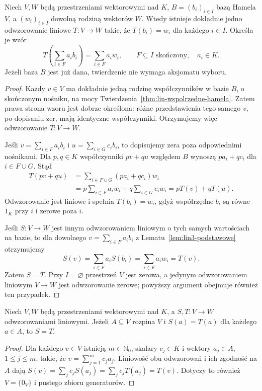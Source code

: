 \begin{twierdzenie}
\label{thm:lin3-przedluzenie-z-bazy}
Niech \(V,W\) będą przestrzeniami wektorowymi nad \(K\),
\(B=(b_i)_{i\in I}\) bazą Hamela \(V\), a
\((w_i)_{i\in I}\) dowolną rodziną wektorów \(W\).
Wtedy istnieje dokładnie jedno odwzorowanie liniowe
\(T\colon V\to W\) takie, że \(T(b_i)=w_i\)
dla każdego \(i\in I\). Określa je wzór
\[
 T\left(\sum_{i\in F}a_ib_i\right)
   =\sum_{i\in F}a_iw_i,
 \qquad F\subseteq I\text{ skończony},\quad a_i\in K.
\]
Jeżeli baza \(B\) jest już dana, twierdzenie
nie wymaga aksjomatu wyboru.
\end{twierdzenie}
\begin{proof}
Każdy \(v\in V\) ma dokładnie jedną rodzinę
współczynników w bazie \(B\), o skończonym nośniku,
na mocy Twierdzenia~\ref{thm:lin-wspolrzedne-hamela}.
Zatem prawa strona wzoru jest dobrze określona:
różne przedstawienia tego samego \(v\),
po dopisaniu zer, mają identyczne współczynniki.
Otrzymujemy więc odwzorowanie \(T\colon V\to W\).

Jeśli \(v=\sum_{i\in F}a_ib_i\) i
\(u=\sum_{i\in G}c_ib_i\), to dopisujemy zera
poza odpowiednimi nośnikami. Dla \(p,q\in K\)
współczynniki \(pv+qu\) względem \(B\)
wynoszą \(pa_i+qc_i\) dla \(i\in F\cup G\).
Stąd
\[
 \begin{aligned}
 T(pv+qu)
 &=\sum_{i\in F\cup G}(pa_i+qc_i)w_i\\
 &=p\sum_{i\in F}a_iw_i
   +q\sum_{i\in G}c_iw_i
 =pT(v)+qT(u).
 \end{aligned}
\]
Odwzorowanie jest liniowe i spełnia
\(T(b_i)=w_i\), gdyż współrzędne \(b_i\)
są równe \(1_K\) przy \(i\) i zerowe poza \(i\).

Jeśli \(S\colon V\to W\) jest innym odwzorowaniem
liniowym o tych samych wartościach na bazie,
to dla dowolnego \(v=\sum_{i\in F}a_ib_i\)
z Lematu~\ref{lem:lin3-podstawowe} otrzymujemy
\[
 S(v)=\sum_{i\in F}a_iS(b_i)
      =\sum_{i\in F}a_iw_i=T(v).
\]
Zatem \(S=T\). Przy \(I=\varnothing\)
przestrzeń \(V\) jest zerowa, a jedynym
odwzorowaniem liniowym \(V\to W\)
jest odwzorowanie zerowe; powyższy argument
obejmuje również ten przypadek.
\end{proof}

\begin{wniosek}
\label{cor:lin3-zgodnosc-na-generatorach}
Niech \(V,W\) będą przestrzeniami wektorowymi
nad \(K\), a \(S,T\colon V\to W\)
odwzorowaniami liniowymi. Jeżeli
\(A\subseteq V\) rozpina \(V\) i \(S(a)=T(a)\)
dla każdego \(a\in A\), to \(S=T\).
\end{wniosek}
\begin{proof}
Dla każdego \(v\in V\) istnieją
\(m\in\mathbb N_0\), skalary \(c_j\in K\)
i wektory \(a_j\in A\), \(1\leq j\leq m\),
takie, że \(v=\sum_{j=1}^{m}c_ja_j\).
Liniowość obu odwzorowań i ich zgodność
na \(A\) dają
\(S(v)=\sum_jc_jS(a_j)=\sum_jc_jT(a_j)=T(v)\).
Dotyczy to również \(V=\{0_V\}\)
i pustego zbioru generatorów.
\end{proof}

